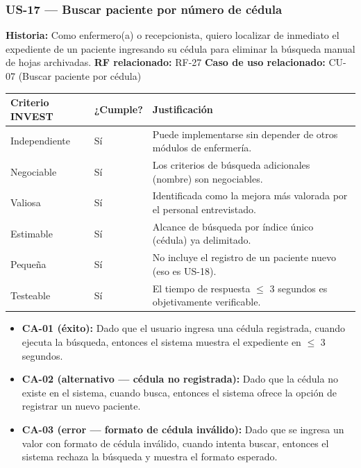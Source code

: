 \documentclass[11pt,a4paper]{article}
\providecommand{\tightlist}{%
	\setlength{\itemsep}{0pt}\setlength{\parskip}{0pt}}
\begin{document}
	\subsubsection{US-17 --- Buscar paciente por número de cédula}
	
	\textbf{Historia:} Como enfermero(a) o recepcionista, quiero localizar de inmediato el expediente de un paciente ingresando su cédula para eliminar la búsqueda manual de hojas archivadas.
	\textbf{RF relacionado:} RF-27
	\textbf{Caso de uso relacionado:} CU-07 (Buscar paciente por cédula)
	
	\begin{longtable}{p{} p{} p{}}
		
		
		\toprule
		\textbf{Criterio INVEST} &
		\textbf{¿Cumple?} &
		\textbf{Justificación} \\
		\midrule
		\endhead
		
		Independiente & Sí & Puede implementarse sin depender de otros módulos de enfermería. \\
		Negociable & Sí & Los criterios de búsqueda adicionales (nombre) son negociables. \\
		Valiosa & Sí & Identificada como la mejora más valorada por el personal entrevistado. \\
		Estimable & Sí & Alcance de búsqueda por índice único (cédula) ya delimitado. \\
		Pequeña & Sí & No incluye el registro de un paciente nuevo (eso es US-18). \\
		Testeable & Sí & El tiempo de respuesta \(\leq\) 3 segundos es objetivamente verificable. \\
		\bottomrule
	\end{longtable}
	
	\begin{itemize}
		\tightlist
		\item
		\textbf{CA-01 (éxito):} Dado que el usuario ingresa una cédula registrada, cuando ejecuta la búsqueda, entonces el sistema muestra el expediente en \(\leq\) 3 segundos.
		\item
		\textbf{CA-02 (alternativo --- cédula no registrada):} Dado que la cédula no existe en el sistema, cuando busca, entonces el sistema ofrece la opción de registrar un nuevo paciente.
		\item
		\textbf{CA-03 (error --- formato de cédula inválido):} Dado que se ingresa un valor con formato de cédula inválido, cuando intenta buscar, entonces el sistema rechaza la búsqueda y muestra el formato esperado.
	\end{itemize}
	
\end{document}

